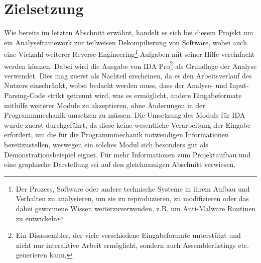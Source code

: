 \documentclass[11pt]{article} %
\begin{document}
\section{Zielsetzung} Wie bereits im letzten Abschnitt erwähnt, handelt es sich bei diesem Projekt
um ein Analyseframework zur teilweisen Dekompilierung von Software, wobei auch eine Vielzahl
weiterer Reverse-Engineering\footnote{Der Prozess, Software oder andere technische Systeme in ihrem
Aufbau und Verhalten zu analysieren, um sie zu reproduzieren, zu modifizieren oder das dabei
gewonnene Wissen weiterzuverwenden, z.B. um Anti-Malware Routinen zu entwickeln}-Aufgaben mit seiner
Hilfe vereinfacht werden können. Dabei wird die Ausgabe von IDA Pro\footnote{Ein Disassembler, der
viele verschiedene Eingabeformate unterstützt und nicht nur interaktive Arbeit ermöglicht, sondern
auch Assemblerlistings etc. generieren kann.} als Grundlage der Analyse verwendet. Dies mag zuerst
als Nachteil erscheinen, da es den Arbeitsverlauf des Nutzers einschränkt, wobei bedacht werden
muss, dass der Analyse- und Input-Parsing-Code strikt getrennt wird, was es ermöglicht, andere
Eingabeformate mithilfe weiterer Module zu akzeptieren, ohne Änderungen in der Programmmechanik
umsetzen zu müssen. Die Umsetzung des Moduls für IDA wurde zuerst durchgeführt, da diese keine
wesentliche Verarbeitung der Eingabe erfordert, um die für die Programmmechanik notwendigen
Informationen bereitzustellen, weswegen ein solches Modul sich besonders gut als
Demonstrationsbeispiel eignet. Für mehr Informationen zum Projektaufbau und eine graphische
Darstellung sei auf den gleichnamigen Abschnitt verwiesen.
\end{document}
